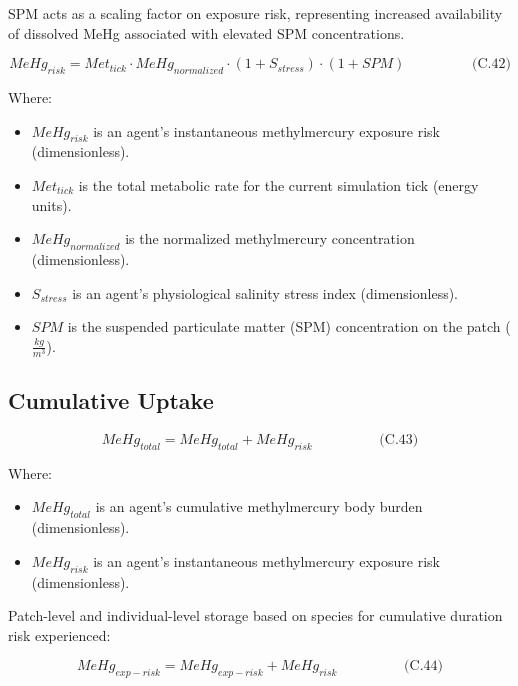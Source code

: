 \documentclass[
]{book}
\providecommand{\tightlist}{%
  \setlength{\itemsep}{0pt}\setlength{\parskip}{0pt}}
\begin{document}
SPM acts as a scaling factor on exposure risk, representing increased
availability of dissolved MeHg associated with elevated SPM
concentrations.

\[
\begin{equation} MeHg_{risk} = Met_{tick} \cdot MeHg_{normalized} \cdot (1 + S_{stress}) \cdot (1 + SPM)  \hspace{2cm} \text{(C.42)} \end{equation}
\]

Where:

\begin{itemize}
\tightlist
\item
  \(MeHg_{risk}\) is an agent's instantaneous methylmercury exposure
  risk (dimensionless).
\item
  \(Met_{tick}\) is the total metabolic rate for the current simulation
  tick (energy units).
\item
  \(MeHg_{normalized}\) is the normalized methylmercury concentration
  (dimensionless).
\item
  \(S_{stress}\) is an agent's physiological salinity stress index
  (dimensionless).
\item
  \(SPM\) is the suspended particulate matter (SPM) concentration on the
  patch (\(\frac{kg}{m^3}\)).
\end{itemize}

\subsection{Cumulative Uptake}\label{cumulative-uptake}

\[
\begin{equation} MeHg_{total} = MeHg_{total} + MeHg_{risk}  \hspace{2cm} \text{(C.43)} \end{equation}
\]

Where:

\begin{itemize}
\tightlist
\item
  \(MeHg_{total}\) is an agent's cumulative methylmercury body burden
  (dimensionless).
\item
  \(MeHg_{risk}\) is an agent's instantaneous methylmercury exposure
  risk (dimensionless).
\end{itemize}

Patch-level and individual-level storage based on species for cumulative
duration risk experienced:

\[
\begin{equation} MeHg_{exp-risk} = MeHg_{exp-risk} + MeHg_{risk} \hspace{2cm} \text{(C.44)} \end{equation}
\]
\end{document}
